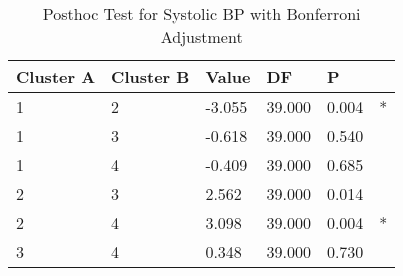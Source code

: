 \begin{table}[h]
\caption{Posthoc Test for Systolic BP with Bonferroni Adjustment}
\label{tab:posthoc_Systolic_BP}
\begin{tabular}{llllll}
\toprule
Cluster A & Cluster B & Value & DF & P &   \\
\midrule
1 & 2 & -3.055 & 39.000 & 0.004 & * \\
1 & 3 & -0.618 & 39.000 & 0.540 &   \\
1 & 4 & -0.409 & 39.000 & 0.685 &   \\
2 & 3 & 2.562 & 39.000 & 0.014 &   \\
2 & 4 & 3.098 & 39.000 & 0.004 & * \\
3 & 4 & 0.348 & 39.000 & 0.730 &   \\
\bottomrule
\end{tabular}
\end{table}
